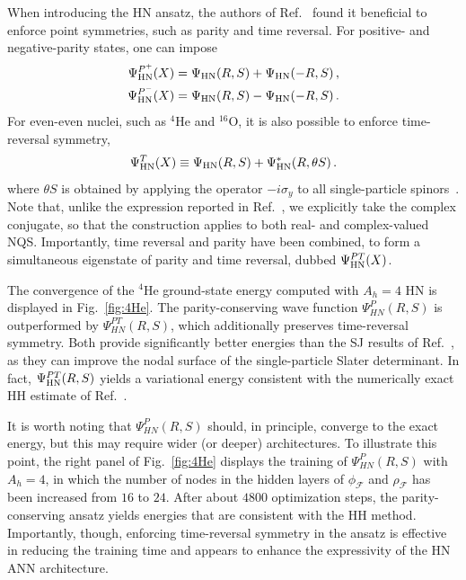 When introducing the HN ansatz, the authors of Ref.~\cite{lovato_hidden-nucleons_2022} found it beneficial
to enforce point symmetries, such as parity and time reversal. For positive- and negative-parity states, one can impose
\begin{align}
\Psi_{\rm HN}^{P^+}(X) &= \Psi_{\rm HN}(R,S) + \Psi_{\rm HN}(-R,S)\,, \nonumber\\
\Psi_{\rm HN}^{P^-}(X) &= \Psi_{\rm HN}(R,S) - \Psi_{\rm HN}(-R,S)\,.
\label{eq:psi_P}
\end{align}
For even-even nuclei, such as $^4$He and $^{16}$O, it is also possible to enforce time-reversal symmetry,
\begin{align}
\Psi_{\rm HN}^{T}(X) \equiv \Psi_{\rm HN}(R,S) + \Psi_{\rm HN}^{*}(R,\theta S)\,.
\label{eq:psi_PT}
\end{align}
where $\theta S$ is obtained by applying the operator $-i\sigma_y$ to all single-particle spinors~\cite{bohr_nuclear_1998}.
Note that, unlike the expression reported in Ref.~\cite{lovato_hidden-nucleons_2022}, we explicitly take the complex conjugate, so that the construction applies to both real- and complex-valued NQS. Importantly, time reversal and parity have been combined, to form a simultaneous eigenstate of parity and time reversal, dubbed $\Psi_{\rm HN}^{PT}(X)$. 

The convergence of the $^4$He ground-state energy computed with $A_h = 4$ HN is displayed in Fig.~\ref{fig:4He}. The parity-conserving wave function $\Psi_{HN}^{P}(R,S)$ is outperformed by $\Psi_{HN}^{PT}(R,S)$, which additionally preserves time-reversal symmetry. Both provide significantly better energies than the SJ results of Ref.~\cite{Gnech2021}, as they can improve the nodal surface of the single-particle Slater determinant. In fact, $\Psi_{\rm HN}^{PT}(R,S)$ yields a variational energy consistent with the numerically exact HH estimate of Ref.~\cite{Gnech2021}. 

It is worth noting that $\Psi_{HN}^{P}(R,S)$ should, in principle, converge to the exact energy, but this may require wider (or deeper) architectures.
To illustrate this point, the right panel of Fig.~\ref{fig:4He} displays the training of $\Psi_{HN}^{P}(R,S)$ with $A_h=4$, in which the number of nodes in the hidden layers of $\phi_\mathcal{F}$ and $\rho_\mathcal{F}$ has been increased from $16$ to $24$. After about $4800$ optimization steps, the parity-conserving ansatz yields energies that are consistent with the HH method. 
Importantly, though,
enforcing time-reversal symmetry in the ansatz is effective in reducing the training time and appears to enhance the expressivity of the HN ANN architecture.

